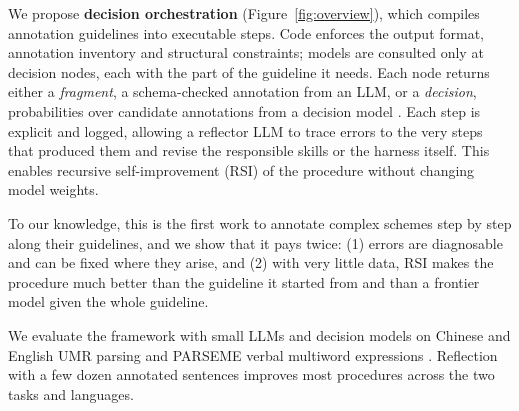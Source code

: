 We propose \textbf{decision orchestration} (Figure~\ref{fig:overview}), which compiles annotation guidelines into executable steps. Code enforces the output format, annotation inventory and structural constraints; models are consulted only at decision nodes, each with the part of the guideline it needs. Each node returns either a \emph{fragment}, a schema-checked annotation from an LLM, or a \emph{decision}, probabilities over candidate annotations from a decision model \citep{typesafe2026jev,openai2026decisions,microsoft2026decision}. Each step is explicit and logged, allowing a reflector LLM to trace errors to the very steps that produced them and revise the responsible skills or the harness itself. This enables recursive self-improvement (RSI) of the procedure without changing model weights.

To our knowledge, this is the first work to annotate complex schemes step by step along their guidelines, and we show that it pays twice: (1) errors are diagnosable and can be fixed where they arise, and (2) with very little data, RSI makes the procedure much better than the guideline it started from and than a frontier model given the whole guideline. 


We evaluate the framework with small LLMs and decision models on Chinese and English UMR parsing \citep{stepanek2026first} and PARSEME verbal multiword expressions \citep{ramisch2018parseme,ramisch2020parseme}. Reflection with a few dozen annotated sentences improves most procedures across the two tasks and languages. 




